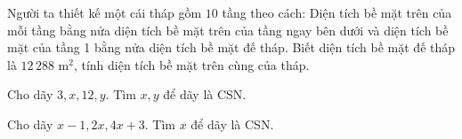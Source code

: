 \begin{bt}%

	Người ta thiết kế một cái tháp gồm $10$ tầng theo cách: Diện tích bề mặt trên của mỗi tầng bằng nửa diện tích bề mặt trên của tầng ngay bên dưới và diện tích bề mặt của tầng 1 bằng nửa diện tích bề mặt đế tháp. Biết diện tích bề mặt đế tháp là $12\, 288$ m$^2$, tính diện tích bề mặt trên cùng của tháp.
\end{bt}

\begin{bt}%

	Cho dãy $3,x,12,y$. Tìm $x,y$ để dãy là CSN.
\end{bt}

\begin{bt}%

	Cho dãy  $x-1, 2x, 4x+3$. Tìm $x$ để dãy là CSN. 
\end{bt}


